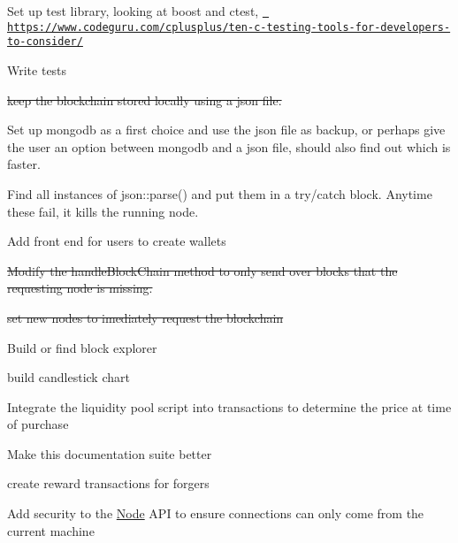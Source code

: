 
\begin{DoxyItemize}
\item Set up test library, looking at boost and ctest, \href{https://www.codeguru.com/cplusplus/ten-c-testing-tools-for-developers-to-consider/}{\texttt{ https\+://www.\+codeguru.\+com/cplusplus/ten-\/c-\/testing-\/tools-\/for-\/developers-\/to-\/consider/}}
\item Write tests
\item \sout{keep the blockchain stored locally using a json file.}
\item Set up mongodb as a first choice and use the json file as backup, or perhaps give the user an option between mongodb and a json file, should also find out which is faster.
\item Find all instances of json\+::parse() and put them in a try/catch block. Anytime these fail, it kills the running node.
\item Add front end for users to create wallets
\item \sout{Modify the handle\+Block\+Chain method to only send over blocks that the requesting node is missing.}
\item \sout{set new nodes to imediately request the blockchain}
\item Build or find block explorer
\item build candlestick chart
\item Integrate the liquidity pool script into transactions to determine the price at time of purchase
\item Make this documentation suite better
\item create reward transactions for forgers
\item Add security to the \mbox{\hyperlink{class_node}{Node}} API to ensure connections can only come from the current machine 
\end{DoxyItemize}